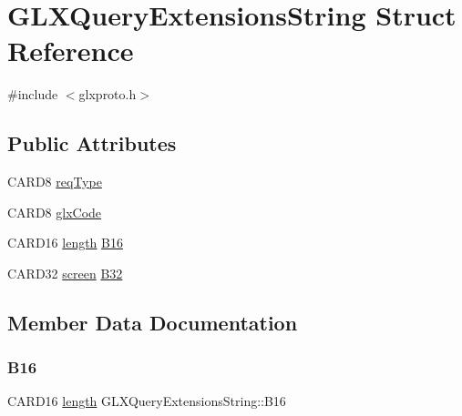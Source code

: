 \hypertarget{struct_g_l_x_query_extensions_string}{}\section{G\+L\+X\+Query\+Extensions\+String Struct Reference}
\label{struct_g_l_x_query_extensions_string}


{\ttfamily \#include $<$glxproto.\+h$>$}

\subsection*{Public Attributes}
\begin{DoxyCompactItemize}
\item 
C\+A\+R\+D8 \hyperlink{struct_g_l_x_query_extensions_string_a5d4c2969ed0fa287f6528b7459ebfc6c}{req\+Type}
\item 
C\+A\+R\+D8 \hyperlink{struct_g_l_x_query_extensions_string_a33d5f71338c6bc651cdf67368b4bd439}{glx\+Code}
\item 
C\+A\+R\+D16 \hyperlink{glcorearb_8h_ab9c919755bde3b34349e23a32b4e0fa7}{length} \hyperlink{struct_g_l_x_query_extensions_string_a560e01503438ee198f0d25244b50d4bd}{B16}
\item 
C\+A\+R\+D32 \hyperlink{cad_8h_ae04e09e4e3831bfc1632c509ae37dcec}{screen} \hyperlink{struct_g_l_x_query_extensions_string_a8b4064c0377c145022b941bb350f7b62}{B32}
\end{DoxyCompactItemize}


\subsection{Member Data Documentation}
\mbox{\label{struct_g_l_x_query_extensions_string_a560e01503438ee198f0d25244b50d4bd}} 
\subsubsection{\texorpdfstring{B16}{B16}}
{\footnotesize\ttfamily C\+A\+R\+D16 \hyperlink{glcorearb_8h_ab9c919755bde3b34349e23a32b4e0fa7}{length} G\+L\+X\+Query\+Extensions\+String\+::\+B16}

\mbox{\label{struct_g_l_x_query_extensions_string_a8b4064c0377c145022b941bb350f7b62}} 
